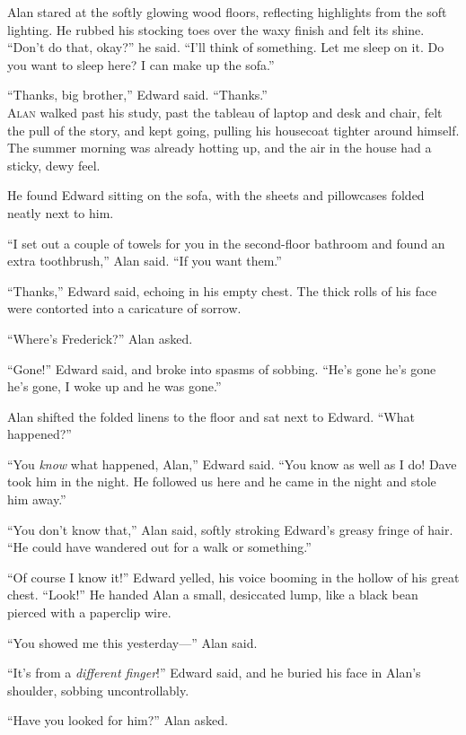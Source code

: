 Alan stared at the softly glowing wood floors, reflecting highlights
from the soft lighting.  He rubbed his stocking toes over the waxy
finish and felt its shine.  ``Don't do that, okay?'' he said.  ``I'll
think of something.  Let me sleep on it.  Do you want to sleep here? 
I can make up the sofa.''

``Thanks, big brother,'' Edward said.  ``Thanks.''
\\
\lettrine[lines=3, lhang=.5, nindent=0pt, findent=2pt]{A}{lan} walked past his study, past the tableau of laptop and desk and
chair, felt the pull of the story, and kept going, pulling his
housecoat tighter around himself.  The summer morning was already
hotting up, and the air in the house had a sticky, dewy feel.

He found Edward sitting on the sofa, with the sheets and pillowcases
folded neatly next to him.

``I set out a couple of towels for you in the second-floor bathroom
and found an extra toothbrush,'' Alan said.  ``If you want them.''

``Thanks,'' Edward said, echoing in his empty chest.  The thick rolls
of his face were contorted into a caricature of sorrow.

``Where's Frederick?'' Alan asked.

``Gone!'' Edward said, and broke into spasms of sobbing.  ``He's gone
he's gone he's gone, I woke up and he was gone.''

Alan shifted the folded linens to the floor and sat next to Edward. 
``What happened?''

``You \textit{know} what happened, Alan,'' Edward said.  ``You know as
well as I do!  Dave took him in the night.  He followed us here and he
came in the night and stole him away.''

``You don't know that,'' Alan said, softly stroking Edward's greasy
fringe of hair.  ``He could have wandered out for a walk or
something.''

``Of course I know it!'' Edward yelled, his voice booming in the
hollow of his great chest.  ``Look!'' He handed Alan a small,
desiccated lump, like a black bean pierced with a paperclip wire.

``You showed me this yesterday---'' Alan said.

``It's from a \textit{different finger}!'' Edward said, and he buried
his face in Alan's shoulder, sobbing uncontrollably.

``Have you looked for him?'' Alan asked.

